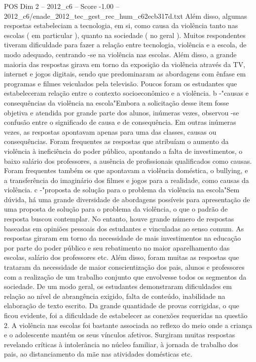 \begin{textsample}{POS Dim 2 – 2012\_c6 – Score -1.00 – 2012\_c6/enade\_2012\_tec\_gest\_rec\_hum\_c62ecb317d.txt}
Além disso, algumas respostas estabeleciam a tecnologia, em si, como causa da violência tanto nas escolas ( em particular ), quanto na sociedade ( no geral ).
Muitos respondentes tiveram dificuldade para fazer a relação entre tecnologia, violência e a escola, de modo adequado, centrando -se na violência nas escolas.
Além disso, a grande maioria das respostas girava em torno da exposição da violência através da TV, internet e jogos digitais, sendo que predominaram as abordagens com ênfase em programas e filmes veiculados pela televisão.
Poucos foram os estudantes que estabeleceram relação entre o contexto socioeconômico e a violência. b -"causas e consequências da violência na escola"Embora a solicitação desse item fosse objetiva e atendida por grande parte dos alunos, inúmeras vezes, observou -se confusão entre o significado de causa e de consequência.
Em outras inúmeras vezes, as respostas apontavam apenas para uma das classes, causas ou consequências.
Foram frequentes as respostas que atribuíam o aumento da violência à ineficiência do poder público, apontando a falta de investimentos, o baixo salário dos professores, a ausência de profissionais qualificados como causas.
Foram frequentes também os que apontavam a violência doméstica, o bullying, e a transferência do imaginário dos filmes e jogos para a realidade, como causas da violência. c -"proposta de solução para o problema da violência na escola"Sem dúvida, há uma grande diversidade de abordagens possíveis para apresentação de uma proposta de solução para o problema da violência, o que o padrão de resposta buscou contemplar.
No entanto, houve grande número de respostas baseadas em opiniões pessoais dos estudantes e vinculadas ao senso comum.
As respostas giraram em torno da necessidade de mais investimentos na educação por parte do poder público e seu rebatimento no maior aparelhamento das escolas, salário dos professores etc.
Além disso, foram muitas as respostas que trataram da necessidade de maior conscientização dos pais, alunos e professores com a realização de um trabalho conjunto que envolvesse todos os segmentos da sociedade.
De um modo geral, os estudantes demonstraram dificuldades em relação ao nível de abrangência exigido, falta de conteúdo, inabilidade na elaboração de texto escrito.
Da grande quantidade de provas corrigidas, o que ficou evidente, foi a dificuldade de estabelecer as conexões requeridas na questão 2.
A violência nas escolas foi bastante associada ao reflexo do meio onde a criança e o adolescente mantém os seus vínculos afetivos.
Surgiram muitas respostas revelando críticas à intolerância no núcleo familiar, à jornada de trabalho dos pais, ao distanciamento da mãe nas atividades domésticas etc.

\end{textsample}
